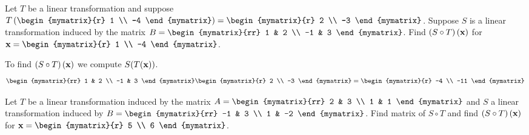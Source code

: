 \begin{enumialphparenastyle}
\begin{ex} Let $T$ be a linear transformation and suppose $T \tup{\begin{mymatrix}{r}
1 \\
-4 
\end{mymatrix} } = \begin{mymatrix}{r}
2 \\
-3 
\end{mymatrix}$. Suppose $S$ is a linear transformation induced by the matrix $B = \begin{mymatrix}{rr}
1 & 2 \\
-1 & 3
\end{mymatrix}$. Find $\left(S \circ T \right) \left(\mbox{\bf x} \right)$ for $\vect{x} = \begin{mymatrix}{r}
1 \\
-4
\end{mymatrix}$. 
\begin{sol}
To find $\left(S \circ T \right) \left(\mbox{\bf x} \right)$ we compute $S(T(\mbox{\bf x}))$. 
\[
\begin{mymatrix}{rr}
1 & 2 \\
-1 & 3
\end{mymatrix}
\begin{mymatrix}{r}
2 \\
-3 
\end{mymatrix}
 = \begin{mymatrix}{r}
-4 \\
-11
\end{mymatrix}
\]
\end{sol}
\end{ex}


\begin{ex}  Let $T$ be a linear transformation induced by the matrix $A = \begin{mymatrix}{rr}
2 & 3 \\
1 & 1
\end{mymatrix}$ and $S$ a linear transformation induced by $B = \begin{mymatrix}{rr}
-1 & 3 \\
1 & -2 
\end{mymatrix}$. Find matrix of $S \circ T$ and find $\left(S \circ T \right) \left(\mbox{\bf x} \right)$ for $\vect{x} = \begin{mymatrix}{r}
5 \\
6 
\end{mymatrix}$. 
\end{ex}



\end{enumialphparenastyle}
